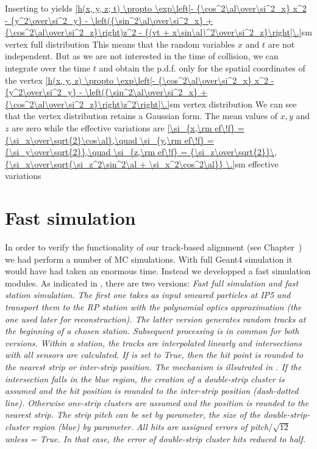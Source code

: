 Inserting  to  yields
\eqref{h(x, y, z; t) \propto \exp\left[- {\cos^2\al\over\si^2_x} x^2 - {y^2\over\si^2_y} - \left({\sin^2\al\over\si^2_x} + {\cos^2\al\over\si^2_z}\right)z^2 - {(vt + x\sin\al)^2\over\si^2_z}\right]\.}{sm vertex full distribution}
This means that the random variables $x$ and $t$ are not independent. But as we are not interested in the time of collision, we can integrate over the time $t$ and obtain the \hbox{p.d.f.} only for the spatial coordinates of the vertex
\eqref{h(x, y, z) \propto \exp\left[- {\cos^2\al\over\si^2_x} x^2 - {y^2\over\si^2_y} - \left({\sin^2\al\over\si^2_x} + {\cos^2\al\over\si^2_z}\right)z^2\right]\.}{sm vertex distribution}
We can see that the vertex distribution retains a Gaussian form. The mean values of $x, y$ and $z$ are zero while the effective variations are
\eqref{\si_{x,\rm ef\!f} = {\si_x\over\sqrt{2}\cos\al},\quad \si_{y,\rm ef\!f} = {\si_y\over\sqrt{2}},\quad \si_{z,\rm ef\!f} = {\si_z\over\sqrt{2}}\,{\si_x\over\sqrt{\si_z^2\sin^2\al + \si_x^2\cos^2\al}} \.}{sm effective variations}

\section[fast simu]{Fast simulation}

In order to verify the functionality of our track-based alignment (see Chapter~) we had perform a number of MC simulations. With full Geant4 simulation it would have had taken an enormous time. Instead we developped a fast simulation modules. As indicated in , there are two versions: \em{Fast full simulation} and \em{fast station simulation}. The first one takes as input smeared particles at IP5 and transport them to the RP station with the polynomial optics approximation (the one used later for reconstruction). The latter version generates random tracks at the beginning of a chosen station. Subsequent processing is in common for both versions. Within a station, the tracks are interpolated linearly and intersections with all sensors are calculated. If  is set to True, then the hit point is rounded to the nearest strip or inter-strip position. The mechanism is illsutrated in . If the intersection falls in the blue region, the creation of a double-strip cluster is assumed and the hit position is rounded to the inter-strip position (dash-dotted line). Otherwise one-strip clusters are assumed and the position is rounded to the nearest strip. The strip pitch can be set by  parameter, the size of the double-strip-cluster region (blue) by  parameter. All hits are assigned errors of pitch$/\sqrt{12}$ unless  = True. In that case, the error of double-strip cluster hits reduced to half.

